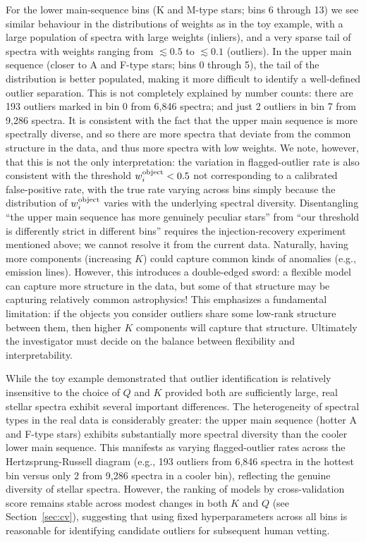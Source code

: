 \documentclass[onecolumn,floatfix,linenumbers,trackchanges]{aastex631}
\begin{document}
For the lower main-sequence bins (K and M-type stars; bins 6 through 13) we see similar behaviour in the distributions of weights as in the toy example, with a large population of spectra with large weights (inliers), and a very sparse tail of spectra with weights ranging from $\lesssim 0.5$ to $\lesssim 0.1$ (outliers).
In the upper main sequence (closer to A and F-type stars; bins 0 through 5), the tail of the distribution is better populated, making it more difficult to identify a well-defined outlier separation.
This is not completely explained by number counts: there are 193 outliers marked in bin 0 from 6,846 spectra; and just 2 outliers in bin 7 from 9,286 spectra.
It is consistent with the fact that the upper main sequence is more spectrally diverse, and so there are more spectra that deviate from the common structure in the data, and thus more spectra with low weights.
We note, however, that this is not the only interpretation: the variation in flagged-outlier rate is also consistent with the threshold $w_i^{\rm object}<0.5$ not corresponding to a calibrated false-positive rate, with the true rate varying across bins simply because the distribution of $w_i^{\rm object}$ varies with the underlying spectral diversity. Disentangling ``the upper main sequence has more genuinely peculiar stars'' from ``our threshold is differently strict in different bins'' requires the injection-recovery experiment mentioned above; we cannot resolve it from the current data.
Naturally, having more components (increasing $K$) could capture common kinds of anomalies (e.g., emission lines).
However, this introduces a double-edged sword: a flexible model can capture more structure in the data, but some of that structure may be capturing relatively common astrophysics! 
This emphasizes a fundamental limitation: if the objects you consider outliers share some low-rank structure between them, then higher $K$ components will capture that structure. Ultimately the investigator must decide on the balance between flexibility and interpretability.

While the toy example demonstrated that outlier identification is relatively insensitive to the choice of $Q$ and $K$ provided both are sufficiently large, real stellar spectra exhibit several important differences. The heterogeneity of spectral types in the real data is considerably greater: the upper main sequence (hotter A and F-type stars) exhibits substantially more spectral diversity than the cooler lower main sequence. This manifests as varying flagged-outlier rates across the Hertzsprung-Russell diagram (e.g., 193 outliers from 6,846 spectra in the hottest bin versus only 2 from 9,286 spectra in a cooler bin), reflecting the genuine diversity of stellar spectra. However, the ranking of models by cross-validation score remains stable across modest changes in both $K$ and $Q$ (see Section~\ref{sec:cv}), suggesting that using fixed hyperparameters across all bins is reasonable for identifying candidate outliers for subsequent human vetting.
\end{document}
